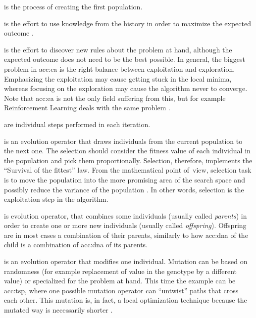  is the process of creating the first population.

 is the effort to use knowledge from the history in order to maximize the expected outcome \citep{SelfAdaptiveFeaturesInRealParameterEvolutionaryAlgorithms}.

 is the effort to discover new rules about the problem at hand, although the expected outcome does not need to be the best possible. In general, the biggest problem in \acrshort{acc:ea} is the right balance between exploitation and exploration. Emphasizing the exploitation may cause getting stuck in the local minima, whereas focusing on the exploration may cause the algorithm never to converge. Note that \acrshort{acc:ea} is not the only field suffering from this, but for \mbox{example} Reinforcement Learning deals with the same problem \citep{ExplorationExploitationDilemaRL}. 

 are individual steps performed in each iteration.

 is an evolution operator that draws individuals from the current population to the next one. The selection should consider the fitness value of each individual in the population and pick them proportionally. Selection, therefore, implements the \enquote{Survival of the fittest} law. From the mathematical point \mbox{of view}, selection task is to move the population into the more promising area of the search space and possibly reduce the variance of the population \citep{SelfAdaptiveFeaturesInRealParameterEvolutionaryAlgorithms}. In other words, selection is the exploitation step in the algorithm.

 is evolution operator, that combines some individuals (usually called \emph{parents}) in order to create one or more new individuals (usually called \mbox{\emph{offspring}}). Offspring are in most cases a combination of their parents, similarly to how \acrshort{acc:dna} of the child is a combination of \acrshort{acc:dna} of its parents.

 is an evolution operator that modifies one individual. Mutation can be based on randomness (for example replacement of value in the genotype by a different value) or specialized for the problem at hand. This time the example can be \acrlong{acc:tsp}, where one possible mutation operator can \enquote{untwist} paths that cross each other. This mutation is, in fact, a local \mbox{optimization} technique because the mutated way is necessarily shorter \citep{TSPArticle}.


